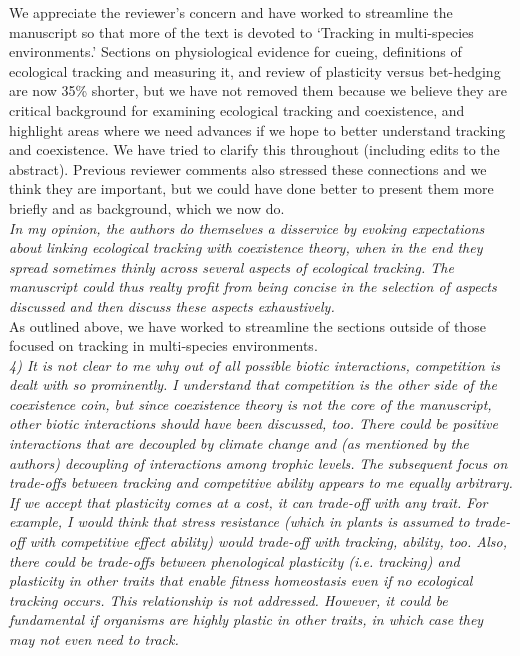 \documentclass[11pt,letterpaper]{article}
\begin{document}
We appreciate the reviewer's concern and have worked to streamline the manuscript so that more of the text is devoted to `Tracking in multi-species environments.' Sections on physiological evidence for cueing, definitions of ecological
tracking and measuring it, and review of plasticity versus bet-hedging are now 35\% shorter, but we have not removed them because we believe they are critical background for examining ecological tracking and coexistence, and highlight areas where we need advances if we hope to better understand tracking and coexistence. We have tried to clarify this throughout (including edits to the abstract). Previous reviewer comments also stressed these connections and we think they are important, but we could have done better to present them more briefly and as background, which we now do. \\

\emph{In my opinion, the authors do themselves a disservice by evoking expectations about linking
ecological tracking with coexistence theory, when in the end they spread sometimes thinly
across several aspects of ecological tracking. The manuscript could thus realty profit from
being concise in the selection of aspects discussed and then discuss these aspects
exhaustively.}\\

As outlined above, we have worked to streamline the sections outside of those focused on tracking in multi-species environments.\\

\emph{4) It is not clear to me why out of all possible biotic interactions, competition is dealt
with so prominently. I understand that competition is the other side of the coexistence coin,
but since coexistence theory is not the core of the manuscript, other biotic interactions
should have been discussed, too. There could be positive interactions that are decoupled by
climate change and (as mentioned by the authors) decoupling of interactions among trophic
levels.}
\emph{The subsequent focus on trade-offs between tracking and competitive ability appears to me
equally arbitrary. If we accept that plasticity comes at a cost, it can trade-off with any
trait. For example, I would think that stress resistance (which in plants is assumed to
trade-off with competitive effect ability) would trade-off with tracking, ability, too. Also,
there could be trade-offs between phenological plasticity (i.e. tracking) and plasticity in
other traits that enable fitness homeostasis even if no ecological tracking occurs. This
relationship is not addressed. However, it could be fundamental if organisms are highly
plastic in other traits, in which case they may not even need to track.}\\
\end{document}
